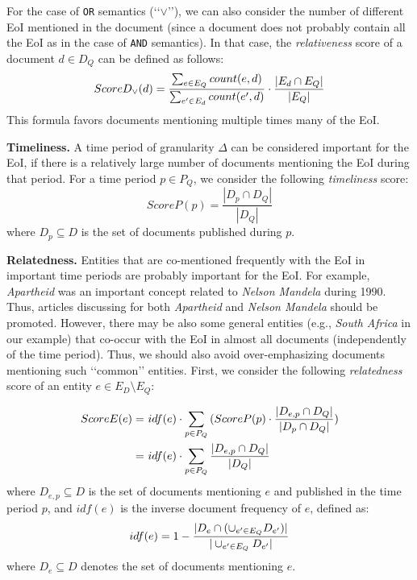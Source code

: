 \documentclass{libtex/sig-alternate-05-2015}
\newcommand{\q}[1]{\lq\lq{}{}#1\rq\rq{}{}}
\begin{document}
For the case of {\tt OR} semantics (\q{$\vee$}),
we can also consider the number of different EoI mentioned in the document
(since a document does not probably contain all the EoI as in the case of {\tt AND} semantics).
In that case, the {\em relativeness} score of a document $d \in D_Q$ can be defined as follows:
\begin{equation}
\small
ScoreD_{\vee}(d) = \frac{\sum_{e \in E_Q}{count(e, d)}}{\sum_{e' \in E_d}{count(e', d)}} \cdot \frac{|E_d \cap E_Q|}{|E_Q|}
\end{equation}
This formula favors documents mentioning multiple times many of the EoI.




\vspace{2mm} \noindent
{\bf Timeliness.}
A time period of granularity $\Delta$ can be considered important
for the EoI, if there is a relatively large number of documents
mentioning the EoI during that period.
For a time period $p \in P_Q$, we consider the following
{\em timeliness} score:
\begin{equation}
ScoreP(p) = \frac{|D_{p} \cap D_Q|}{|D_Q|}
\end{equation}
where $D_{p} \subseteq D$ is the set of documents published during $p$.


\vspace{2mm} \noindent
{\bf Relatedness.}
Entities that are co-mentioned frequently with the EoI
in important time periods are probably important for the EoI.
For example, {\em Apartheid} was an important concept
related to {\em Nelson Mandela} during 1990.
Thus, articles discussing for both {\em Apartheid} and {\em Nelson Mandela}
should be promoted.
However, there may be also some general entities (e.g., {\em South Africa} in our example)
that co-occur with the EoI in almost all documents (independently of the time period).
Thus, we should also avoid over-emphasizing documents mentioning such \q{common} entities.
First, we consider the following {\em relatedness} score
of an entity $e \in E_D \setminus E_Q$:

\begin{equation}
\vspace{-2mm}
\begin{split}
\small
ScoreE(e) = & ~ idf(e) \cdot \sum_{p \in P_Q}{(ScoreP(p) \cdot \frac{|D_{e, p} \cap D_Q|}{|D_p \cap D_Q|})}\\
= & ~ idf(e) \cdot \sum_{p \in P_Q}{\frac{|D_{e, p} \cap D_Q|}{|D_Q|}}
\end{split}
\end{equation}
where $D_{e, p} \subseteq D$ is the set of documents mentioning $e$ and published in the time period $p$,
and $idf(e)$ is the inverse document frequency of $e$, defined as:
\begin{equation}
\label{frml:idf}
\small
idf(e) = 1 - \frac{|D_e \cap (\cup_{e' \in E_Q}{D_{e'}})|}{|\cup_{e' \in E_Q}{D_{e'}}|}
\end{equation}
where $D_e \subseteq D$ denotes the set of documents mentioning $e$.
\end{document}

